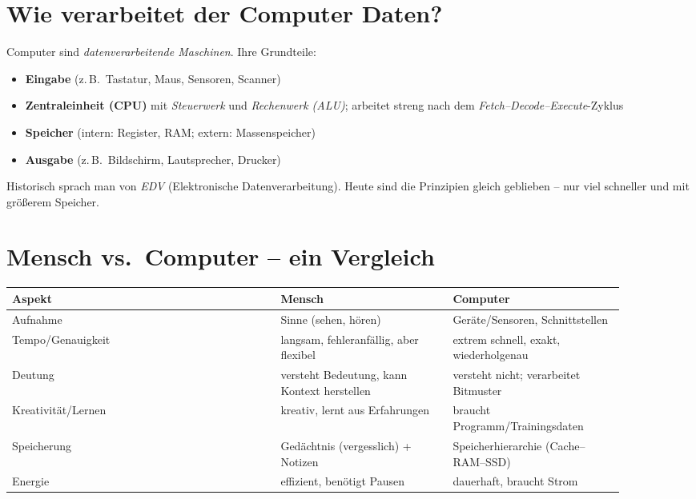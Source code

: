\documentclass[../skript/main.tex]{subfiles}
\begin{document}
	\section{Wie verarbeitet der Computer Daten?}
	Computer sind \emph{datenverarbeitende Maschinen}. Ihre Grundteile:
	\begin{itemize}
		\item \textbf{Eingabe} (z.\,B.\ Tastatur, Maus, Sensoren, Scanner)
		\item \textbf{Zentraleinheit (CPU)} mit \emph{Steuerwerk} und \emph{Rechenwerk (ALU)}; arbeitet
		streng nach dem \emph{Fetch–Decode–Execute}-Zyklus
		\item \textbf{Speicher} (intern: Register, RAM; extern: Massenspeicher)
		\item \textbf{Ausgabe} (z.\,B.\ Bildschirm, Lautsprecher, Drucker)
	\end{itemize}
	Historisch sprach man von \emph{EDV} (Elektronische Datenverarbeitung). Heute sind die
	Prinzipien gleich geblieben – nur viel schneller und mit größerem Speicher.
	
	\section{Mensch vs.\ Computer – ein Vergleich}
	\begin{center}
		\renewcommand{\arraystretch}{1.2}
		\begin{tabular}{|p{0.39\linewidth}|p{0.25\linewidth}|p{0.25\linewidth}|}
			\hline
			\textbf{Aspekt} & \textbf{Mensch} & \textbf{Computer} \\\hline
			Aufnahme & Sinne (sehen, hören) & Geräte/Sensoren, Schnittstellen \\\hline
			Tempo/Genauigkeit & langsam, fehleranfällig, aber flexibel & extrem schnell, exakt, wiederholgenau \\\hline
			Deutung & versteht Bedeutung, kann Kontext herstellen & versteht nicht; verarbeitet Bitmuster \\\hline
			Kreativität/Lernen & kreativ, lernt aus Erfahrungen & braucht Programm/Trainingsdaten \\\hline
			Speicherung & Gedächtnis (vergesslich) + Notizen & Speicherhierarchie (Cache–RAM–SSD) \\\hline
			Energie & effizient, benötigt Pausen & dauerhaft, braucht Strom \\\hline
		\end{tabular}
	\end{center}
	
\end{document}
